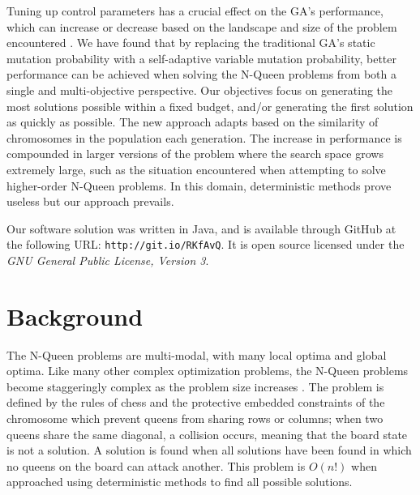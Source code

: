 \documentclass[conference]{IEEEtran}
\begin{document}
Tuning up control parameters has a crucial effect on the GA's performance, which can increase or decrease based on the landscape and size of the problem encountered \cite{ye2010some,coyne1994genetic,srinivas1994adaptive}. We have found that by replacing the traditional GA's static mutation probability with a self-adaptive variable mutation probability, better performance can be achieved when solving the N-Queen problems from both a single and multi-objective perspective. Our objectives focus on generating the most solutions possible within a fixed budget, and/or generating the first solution as quickly as possible. The new approach adapts based on the similarity of chromosomes in the population each generation. The increase in performance is compounded in larger versions of the problem where the search space grows extremely large, such as the situation encountered when attempting to solve higher-order N-Queen problems. In this domain, deterministic methods prove useless but our approach prevails.

Our software solution was written in Java, and is available through GitHub at the following URL: \texttt{http://git.io/RKfAvQ}. It is open source licensed under the \textit{GNU General Public License, Version 3}.

\section{Background}
The N-Queen problems are multi-modal, with many local optima and global optima. 
Like many other complex optimization problems, the N-Queen problems become staggeringly complex as the problem size increases \cite{homaifar1992queens}. The problem is defined by the rules of chess and the protective embedded constraints of the chromosome which prevent queens from sharing rows or columns; when two queens share the same diagonal, a collision occurs, meaning that the board state is not a solution. A solution is found when all solutions have been found in which no queens on the board can attack another. This problem is {$O(n!)$} when approached using deterministic methods to find all possible solutions. 
\end{document}
